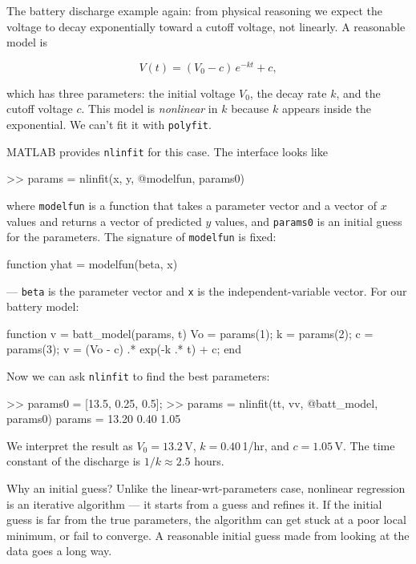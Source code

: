 \documentclass[../../book.tex]{subfiles}
\begin{document}
The battery discharge example again: from physical reasoning we expect the voltage to decay exponentially toward a cutoff voltage, not linearly.  A reasonable model is

\begin{equation*}
    V(t) = (V_0 - c)\,e^{-k t} + c,
\end{equation*}

\noindent which has three parameters: the initial voltage $V_0$, the decay rate $k$, and the cutoff voltage $c$.  This model is \emph{nonlinear} in $k$ because $k$ appears inside the exponential.  We can't fit it with \lstinline{polyfit}.

MATLAB provides \lstinline{nlinfit} for this case.  The interface looks like

\begin{code}
>> params = nlinfit(x, y, @modelfun, params0)
\end{code}

\noindent where \lstinline{modelfun} is a function that takes a parameter vector and a vector of $x$ values and returns a vector of predicted $y$ values, and \lstinline{params0} is an initial guess for the parameters.  The signature of \lstinline{modelfun} is fixed:

\begin{code}
function yhat = modelfun(beta, x)
\end{code}

\noindent --- \lstinline{beta} is the parameter vector and \lstinline{x} is the independent-variable vector.  For our battery model:

\begin{code}
function v = batt_model(params, t)
    Vo = params(1);
    k  = params(2);
    c  = params(3);
    v  = (Vo - c) .* exp(-k .* t) + c;
end
\end{code}

\noindent Now we can ask \lstinline{nlinfit} to find the best parameters:

\begin{code}
>> params0 = [13.5, 0.25, 0.5];           %
>> params  = nlinfit(tt, vv, @batt_model, params0)
params =
    13.20     0.40     1.05
\end{code}

\noindent We interpret the result as $V_0 = 13.2$\,V, $k = 0.40$\,1/hr, and $c = 1.05$\,V.  The time constant of the discharge is $1/k \approx 2.5$ hours.

Why an initial guess?  Unlike the linear-wrt-parameters case, nonlinear regression is an iterative algorithm --- it starts from a guess and refines it.  If the initial guess is far from the true parameters, the algorithm can get stuck at a poor local minimum, or fail to converge.  A reasonable initial guess made from looking at the data goes a long way.
\end{document}
